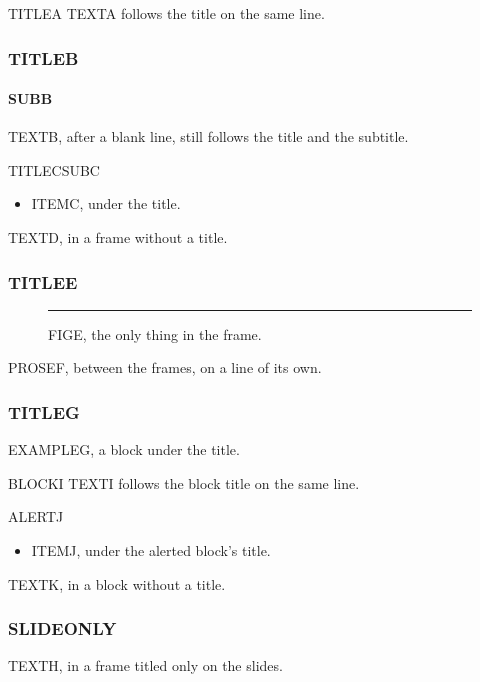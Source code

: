 \mode*
\begin{frame}{TITLEA}
  TEXTA follows the title on the same line. \lipsum[1][1-3]
\end{frame}

\begin{frame}
  \frametitle{TITLEB}
  \framesubtitle{SUBB}

  TEXTB, after a blank line, still follows the title and the subtitle.
\end{frame}

\begin{frame}{TITLEC}{SUBC}
  \begin{itemize}
  \item ITEMC, under the title.
  \end{itemize}
\end{frame}

\begin{frame}
  TEXTD, in a frame without a title.
\end{frame}

\begin{frame}
  \frametitle{TITLEE}
  \begin{figure}[b]
    \centering
    \rule{0.4\linewidth}{1cm}
    \caption{FIGE, the only thing in the frame.}
  \end{figure}
\end{frame}

PROSEF, between the frames, on a line of its own.

\begin{frame}
  \frametitle{TITLEG}
  \begin{example}
    EXAMPLEG, a block under the title.
  \end{example}
\end{frame}

\begin{frame}
  \begin{block}{BLOCKI}
    TEXTI follows the block title on the same line.
  \end{block}
  \begin{alertblock}{ALERTJ}
    \begin{itemize}
    \item ITEMJ, under the alerted block's title.
    \end{itemize}
  \end{alertblock}
  \begin{exampleblock}{}
    TEXTK, in a block without a title.
  \end{exampleblock}
\end{frame}

\begin{frame}
  \frametitle<presentation>{SLIDEONLY}
  TEXTH, in a frame titled only on the slides.
\end{frame}
